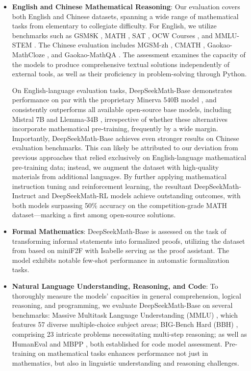 \begin{itemize}[topsep=0pt]
    \item \textbf{English and Chinese Mathematical Reasoning}: Our evaluation covers both English and Chinese datasets, spanning a wide range of mathematical tasks from elementary to collegiate difficulty. For English, we utilize benchmarks such as GSM8K \citep{gsm8k}, MATH \citep{MATH}, SAT \citep{llemma}, OCW Courses \citep{minerva}, and MMLU-STEM \citep{mmlu}. The Chinese evaluation includes MGSM-zh \citep{mgsm}, CMATH \citep{wei2023cmath}, Gaokao-MathCloze \citep{agieval}, and Gaokao-MathQA \citep{agieval}. The assessment examines the capacity of the models to produce comprehensive textual solutions independently of external tools, as well as their proficiency in problem-solving through Python.

On English-language evaluation tasks, DeepSeekMath-Base demonstrates performance on par with the proprietary Minerva 540B model \citep{minerva}, and consistently outperforms all available open-source base models, including Mistral 7B \citep{mistral} and Llemma-34B \citep{llemma}, irrespective of whether these alternatives incorporate mathematical pre-training, frequently by a wide margin. Importantly, DeepSeekMath-Base achieves even stronger results on Chinese evaluation benchmarks. This can likely be attributed to our deviation from previous approaches \citep{minerva,llemma} that relied exclusively on English-language mathematical pre-training data; instead, we augment the dataset with high-quality materials from additional languages. By further applying mathematical instruction tuning and reinforcement learning, the resultant DeepSeekMath-Instruct and DeepSeekMath-RL models achieve outstanding outcomes, with both models surpassing 50\% accuracy on the competition-grade MATH dataset—marking a first among open-source solutions.

\item \textbf{Formal Mathematics}: DeepSeekMath-Base is assessed on the task of transforming informal statements into formalized proofs, utilizing the dataset from \citep{dsp_proof} based on miniF2F \citep{minif2f} with Isabelle \citep{isabelle} serving as the proof assistant. The model exhibits notable few-shot performance in automatic formalization tasks.
\item \textbf{Natural Language Understanding, Reasoning, and Code}: To thoroughly measure the models’ capacities in general comprehension, logical reasoning, and programming, we evaluate DeepSeekMath-Base on several benchmarks: Massive Multitask Language Understanding (MMLU) \citep{mmlu}, which features 57 diverse multiple-choice subject areas; BIG-Bench Hard (BBH) \citep{bbh}, comprising 23 intricate problems necessitating multi-step reasoning; as well as HumanEval \citep{codex} and MBPP \citep{mbpp}, both established for code model assessment. Pre-training on mathematical tasks enhances performance not just in mathematics, but also in linguistic understanding and reasoning challenges.


\end{itemize}
